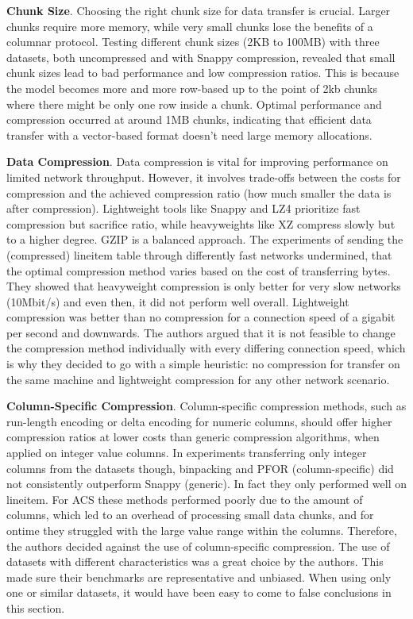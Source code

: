 \documentclass[sigconf]{acmart}
\begin{document}
\textbf{Chunk Size}.
Choosing the right chunk size for data transfer is crucial. Larger chunks require more memory, while very small chunks lose the benefits of a columnar protocol. Testing different chunk sizes (2KB to 100MB) with three datasets, both uncompressed and with Snappy \cite{snappy2016} compression, revealed that small chunk sizes lead to bad performance and low compression ratios. This is because the model becomes more and more row-based up to the point of 2kb chunks where there might be only one row inside a chunk. Optimal performance and compression occurred at around 1MB chunks, indicating that efficient data transfer with a vector-based format doesn't need large memory allocations.

\textbf{Data Compression}.
Data compression is vital for improving performance on limited network throughput. However, it involves trade-offs between the costs for compression and the achieved compression ratio (how much smaller the data is after compression). Lightweight tools like Snappy and LZ4 \cite{lz42013} prioritize fast compression but sacrifice ratio, while heavyweights like XZ compress slowly but to a higher degree. GZIP \cite{gzip1993} is a balanced approach.
The experiments of sending the (compressed) lineitem table through differently fast networks undermined, that the optimal compression method varies based on the cost of transferring bytes. They showed that heavyweight compression is only better for very slow networks (10Mbit/s) and even then, it did not perform well overall. Lightweight compression was better than no compression for a connection speed of a gigabit per second and downwards.
The authors argued that it is not feasible to change the compression method individually with every differing connection speed, which is why they  decided to go with a simple heuristic: no compression for transfer on the same machine and lightweight compression for any other network scenario.


\textbf{Column-Specific Compression}.
Column-specific compression methods, such as run-length encoding or delta encoding for numeric columns, should offer higher compression ratios at lower costs than generic compression algorithms, when applied on integer value columns. In experiments transferring only integer columns from the datasets though, binpacking and PFOR \cite{lemire2012decoding} (column-specific) did not consistently outperform Snappy (generic). In fact they only performed well on lineitem. For ACS these methods performed poorly due to the amount of columns, which led to an overhead of processing small data chunks, and for ontime they struggled with the large value range within the columns. Therefore, the authors decided against the use of column-specific compression. 
The use of datasets with different characteristics was a great choice by the authors. This made sure their benchmarks are representative and unbiased. When using only one or similar datasets, it would have been easy to come to false conclusions in this section.
\end{document}
